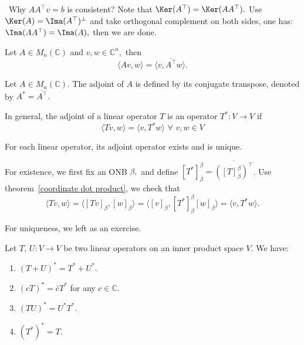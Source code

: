 \begin{remark}\
Why $AA^\top v=b$ is consistent?
Note that $\Ker(A^\top)=\Ker(AA^\top).$ 
Use $\Ker(A)=\Ima(A^\top)^\perp$ and take orthogonal complement on both sides, one has:
$\Ima(AA^\top)=\Ima(A),$ then we are done.
\end{remark}

\begin{theorem}
    Let $A\in M_n(\mathbb{C})$ and $v,w\in\mathbb{C}^n,$ then
    $$\langle Av,w\rangle = \langle v, \overline{A^\top}w\rangle.$$
\end{theorem}

\begin{definition}
    Let $A\in M_n(\mathbb{C}).$ The adjoint of $A$ is defined by its conjugate transpose,
    denoted by $A^*=\overline{A^\top}.$

    In general, the adjoint of a linear operator $T$ is an operator $T^*:V\to V$ if
    \[\langle Tv,w\rangle = \langle v, T^*w\rangle\,\,\forall\,\, v,w\in V\]
\end{definition}

\begin{theorem}
    For each linear operator, its adjoint operator exists and is unique.
\end{theorem}

\begin{pfbox}
    For existence, we first fix an ONB $\beta,$ and define $[T^*]^\beta_{\beta} = \overline{([T]^\beta_{\beta})^\top}$.
    Use theorem~\eqref{coordinate dot product}, we check that 
    $$\langle Tv,w\rangle = \langle [Tv]_\beta,[w]_\beta\rangle = \langle [v]_\beta, [T^*]^\beta_{\beta}[w]_\beta\rangle = \langle v, T^*w\rangle.$$

    For uniqueness, we left as an exercise.
\end{pfbox}


\begin{theorem}
    Let $T,\,U:V\to V$ be two linear operators on an inner product space $V$. We have:
    \begin{enumerate}
        \item $(T+U)^* = T^* + U^*.$
        \item $(cT)^*=\bar{c}T^*$ for any $c\in\mathbb{C}.$
        \item $(TU)^* = U^*T^*.$
        \item $(T^*)^* = T.$
    \end{enumerate}
\end{theorem}


